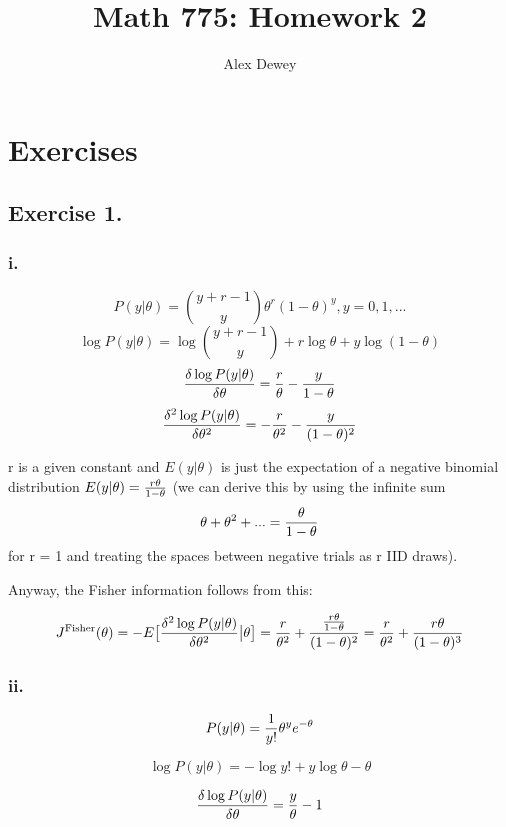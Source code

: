 \documentclass{article}
\begin{document}
\title{Math 775: Homework 2}
\author{Alex Dewey}


\maketitle


\section{Exercises}

\subsection{Exercise 1.}

\subsubsection{i.}

\[P(y\vert\theta) = {y + r - 1 \choose y}\theta^r(1 - \theta)^y, y= 0, 1, ...\]
\[\log P(y\vert\theta) = \log {y + r - 1 \choose y} + r\log\theta + y\log(1 - \theta)\]
\[{\delta\log P(y\vert\theta) \over \delta\theta} = {r \over \theta} - {y \over 1 - \theta}\]
\[{\delta^2\log P(y\vert\theta) \over \delta\theta^2} = -{r \over \theta^2} - {y \over (1 - \theta)^2}\]

r is a given constant and \(E(y \vert \theta)\) is just the expectation of a negative binomial distribution
\(E(y \vert \theta) = {r\theta \over 1 - \theta}\) (we can derive this by using the infinite sum 
\[\theta + \theta^2 +... = {\theta \over 1 - \theta}\] for r = 1 and treating the spaces between
 negative trials as r IID draws).

Anyway, the Fisher information follows from this:

\[J^{\text{Fisher}}(\theta) = -E \big[ {\delta^2\log P(y\vert\theta) \over \delta\theta^2} \big \vert \theta \big]
= {r \over \theta^2} + {{r\theta \over 1 - \theta} \over (1 - \theta)^2} = {r \over \theta^2} + {r\theta \over  (1 - \theta)^3}\]

\subsubsection{ii.}

\[P(y\vert\theta) = {1 \over y!} \theta^y e^{-\theta} \]

\[\log P(y\vert\theta) = -\log{y!} + y\log\theta - \theta \]

\[{\delta\log P(y\vert\theta) \over \delta\theta} = {y \over \theta} - 1 \]
\end{document}
